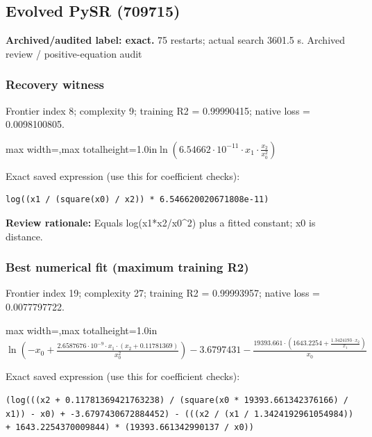 \documentclass[10pt,letterpaper,landscape]{article}
\begin{document}
\begin{minipage}[t]{0.485\textwidth}
\subsection*{Evolved PySR (709715)}
\textbf{Archived/audited label: exact.} 75 restarts; actual search 3601.5 s.
{\small Archived review / positive-equation audit}
\subsubsection*{Recovery witness}
Frontier index 8; complexity 9; training R2 = 0.99990415; native loss = 0.0098100805.
\begin{center}\begin{adjustbox}{max width=\linewidth,max totalheight=1.0in}$\displaystyle \ln{\left(6.54662 \cdot 10^{-11} \cdot x_{1} \cdot \frac{x_{2}}{x_{0}^{2}} \right)}$\end{adjustbox}\end{center}
{\scriptsize Exact saved expression (use this for coefficient checks):}
\begin{lstlisting}
log((x1 / (square(x0) / x2)) * 6.546620020671808e-11)
\end{lstlisting}
{\small\textbf{Review rationale:} Equals log(x1*x2/x0\textasciicircum{}2) plus a fitted constant; x0 is distance.}
\subsubsection*{Best numerical fit (maximum training R2)}
Frontier index 19; complexity 27; training R2 = 0.99993957; native loss = 0.0077797722.
\begin{center}\begin{adjustbox}{max width=\linewidth,max totalheight=1.0in}$\displaystyle \ln{\left(- x_{0} + \frac{2.6587676 \cdot 10^{-9} \cdot x_{1} \cdot \left(x_{2} + 0.11781369\right)}{x_{0}^{2}} \right)} - 3.6797431 - \frac{19393.661 \cdot \left(1643.2254 + \frac{1.3424193 \cdot x_{2}}{x_{1}}\right)}{x_{0}}$\end{adjustbox}\end{center}
{\scriptsize Exact saved expression (use this for coefficient checks):}
\begin{lstlisting}
(log(((x2 + 0.11781369421763238) / (square(x0 * 19393.661342376166) / x1)) - x0) + -3.6797430672884452) - (((x2 / (x1 / 1.3424192961054984)) + 1643.2254370009844) * (19393.661342990137 / x0))
\end{lstlisting}
\end{minipage}
\clearpage{}\label{newton-10002}
\end{document}
